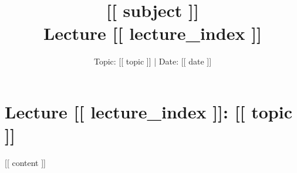 \documentclass[11pt,a4paper]{article}
\title{\textbf{\Large [[ subject ]]}\\[4pt]\large Lecture [[ lecture_index ]]}
\author{Topic: [[ topic ]]  |  Date: [[ date ]]}
\date{}
\begin{document}
\maketitle

\section*{Lecture [[ lecture_index ]]: [[ topic ]]}
[[ content ]]
\end{document}

